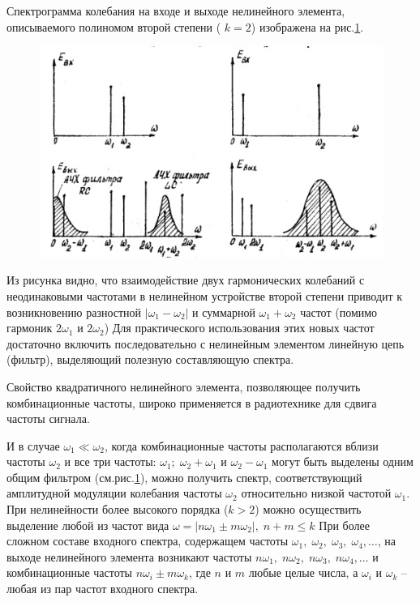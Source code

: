 Спектрограмма колебания на входе и выходе нелинейного элемента, описываемого полиномом второй степени ( $k=2$) изображена на рис.\ref{pic:4}.
\begin{figure}[h!]
	\centering
	\includegraphics[width=0.8\linewidth]{picture/pic4.jpg}
	\caption{}
	\label{pic:4}
\end{figure}

Из рисунка видно, что взаимодействие двух гармонических колебаний с неодинаковыми частотами в нелинейном устройстве второй степени приводит к возникновению разностной $|\omega_1-\omega_2|$ и суммарной $\omega_1+\omega_2$ частот (помимо гармоник $2\omega_1$	и $2\omega_2$)
Для практического использования этих новых частот достаточно включить последовательно с нелинейным элементом линейную цепь (фильтр), выделяющий полезную составляющую спектра.

Свойство квадратичного нелинейного элемента, позволяющее получить комбинационные частоты, широко применяется в радиотехнике для сдвига частоты сигнала.

И в случае $\omega_1\ll\omega_2$, когда комбинационные частоты располагаются вблизи частоты $\omega_2$ и  все три частоты: $\omega_1;\;\omega_2+\omega_1$ и $\omega_2-\omega_1$ могут быть выделены одним общим фильтром (см.рис.\ref{pic:4}), можно получить спектр, соответствующий амплитудной модуляции колебания частоты $\omega_2$ относительно низкой частотой $\omega_1$. При нелинейности более высокого порядка ($k>2$) можно осуществить выделение любой из частот вида $\omega=|n\omega_1\pm m\omega_2|,\;n+m\leq k$
При более сложном составе входного спектра, содержащем частоты $\omega_1,\;\omega_2,\;\omega_3,\;\omega_4,\ldots$, на выходе нелинейного элемента возникают частоты $n\omega_1,\;n\omega_2,\;n\omega_3,\;n\omega_4,\ldots$ и комбинационные
частоты	$n\omega_i\pm m\omega_k$, где $n$ и $m$ любые целые числа, а $\omega_i$ и $\omega_k$ -- любая из пар частот входного спектра.
